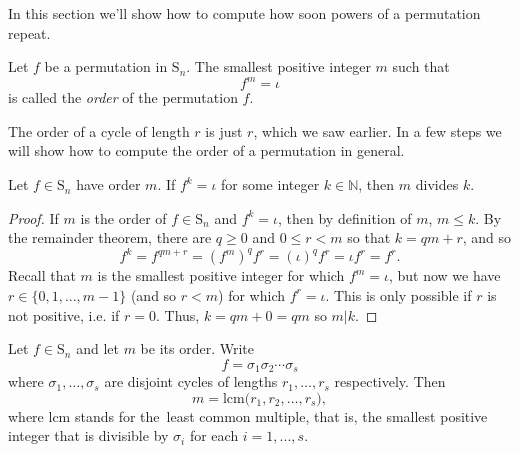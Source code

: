 \documentclass[11pt,dvipsnames]{book}
\numberwithin{figure}{section} %
\numberwithin{table}{section} %
\begin{document}
In this section we'll show how to compute how soon powers of a permutation repeat. 

 \begin{definition}  Let $f$ be a permutation in $\mathrm{S}_n$.  The smallest positive integer
$m$ such that 
$$
f^m=\iota
$$
 is called the \emph{order} of the permutation $f$.
\end{definition}

The order of a cycle of length $r$ is just $r$, which we saw earlier. In a few steps we will show how to compute the order of a permutation in general. 

\begin{lemma}  Let $f\in\mathrm{S}_n$ have order $m$.   If $f^k=\iota$ for some integer $k\in\mathbb{N}$, then $m$ divides $k$.\end{lemma}

\begin{proof}
If $m$ is the order of $f\in\mathrm{S}_n$ and $f^k=\iota$, then by definition of $m$, $m\leq k$. By the remainder theorem, there are $q\geq 0$ and $0\leq r<m$ so that $k=qm+r$, and so
\[
f^{k} = f^{qm+r} = (f^{m})^{q} f^{r} = (\iota)^{q}f^{r} = \iota f^{r}= f^{r}.
\]
Recall that $m$ is the smallest positive integer for which $f^{m}=\iota$, but now we have $r\in \{0,1,...,m-1\}$ (and so $r<m$) for which $f^{r}=\iota$. This is only possible if $r$ is not positive, i.e. if $r=0$. Thus, $k=qm+0=qm$ so $m|k$.
\end{proof}



\begin{lemma}%
Let $f\in\mathrm{S}_n$ and let $m$ be its order. Write
$$
f=\sigma_{1}\sigma_{2}\cdots\sigma_{s}
$$
 where $\sigma_{1},\ldots,\sigma_{s}$ are disjoint cycles of
lengths $r_{1},\ldots,r_{s}$ respectively. Then 
$$
m=\mathrm{lcm}\big(r_{1},r_{2},\ldots,r_{s}\big),
$$
 where $\mathrm{lcm}$ stands for
\textcolor[rgb]{0.00,0.50,0.50}{the~least common multiple}, that is, the smallest positive integer that is divisible by $\sigma_{i}$ for each $i=1,...,s$.
\end{lemma}
\end{document}
